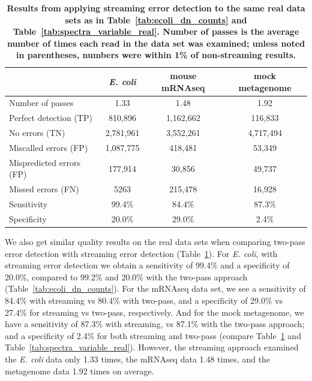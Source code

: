 \documentclass{article}
\begin{document}
\begin{table}
\begin{tabular}{|l|c||c||c|}
\hline
& {\bf \em E. coli} & {\bf mouse mRNAseq} & {\bf mock metagenome} \\
\hline
Number of passes         & 1.33      & 1.48         & 1.92 \\
\hline
Perfect detection (TP)   & 810,896   & 1,162,662  & 116,833  \\
No errors (TN)           & 2,781,961 & 3,552,261  & 4,717,494 \\
Miscalled errors (FP)    & 1,087,775 & 418,481    & 53,349   \\
Mispredicted errors (FP) & 177,914   & 30,856     & 49,737  \\
Missed errors (FN)       & 5263      & 215,478    & 16,928  \\
\hline
Sensitivity            & 99.4\%      & 84.4\%     & 87.3\%  \\
Specificity            & 20.0\%      & 29.0\%     & 2.4\%  \\
\hline
\end{tabular}
\caption{{\bf Results from applying streaming error detection to the same
  real data sets as in Table~\ref{tab:ecoli_dn_counts} and
  Table~\ref{tab:spectra_variable_real}.  Number of passes is the average
  number of times each read in the data set was examined; unless noted in
  parentheses, numbers were within 1\% of non-streaming results.}}
\label{tab:spectra_streaming_real}

\end{table}

We also get similar quality results on the real data sets when
comparing two-pass error detection with streaming error detection
(Table~\ref{tab:spectra_streaming_real}).  For {\em E. coli}, with
streaming error detection we obtain a sensitivity of 99.4\% and a
specificity of 20.0\%, compared to 99.2\% and 20.0\% with the two-pass
approach (Table~\ref{tab:ecoli_dn_counts}).  For the mRNAseq data set,
we see a sensitivity of 84.4\% with streaming vs 80.4\% with two-pass,
and a specificity of 29.0\% vs 27.4\% for streaming vs two-pass,
respectively.  And for the mock metagenome, we have a sensitivity of
87.3\% with streaming, vs 87.1\% with the two-pass approach; and a
specificity of 2.4\% for both streaming and two-pass (compare
Table~\ref{tab:spectra_streaming_real} and
Table~\ref{tab:spectra_variable_real}).  However, the streaming
approach examined the {\em E. coli} data only 1.33 times, the mRNAseq
data 1.48 times, and the metagenome data 1.92 times on average.
\end{document}
